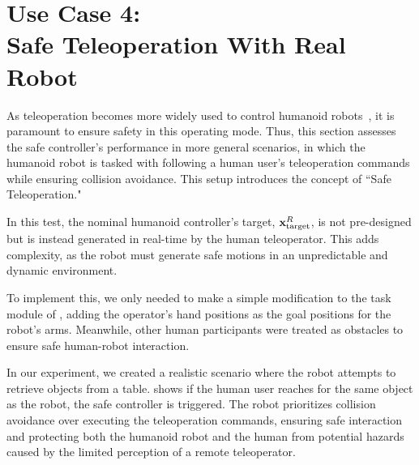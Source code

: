 \section{Use Case 4: \\ Safe Teleoperation With Real Robot}\label{sec: usecase_safe_teleop_real}

As teleoperation becomes more widely used to control humanoid robots~\cite{goodrich2013teleop,kourosh2023teleop}, it is paramount to ensure safety in this operating mode.
Thus, this section assesses the safe controller's performance in more general scenarios, in which the humanoid robot is tasked with following a human user's teleoperation commands while ensuring collision avoidance. This setup introduces the concept of ``Safe Teleoperation."

In this test, the nominal humanoid controller's target, $\mathbf{x}^R_\mathrm{target}$, is not pre-designed but is instead generated in real-time by the human teleoperator. This adds complexity, as the robot must generate safe motions in an unpredictable and dynamic environment.

To implement this, we only needed to make a simple modification to the task module of \spark, adding the operator's hand positions as the goal positions for the robot's arms. Meanwhile, other human participants were treated as obstacles to ensure safe human-robot interaction.

In our experiment, we created a realistic scenario where the robot attempts to retrieve objects from a table. 
 shows if the human user reaches for the same object as the robot, the safe controller is triggered. 
The robot prioritizes collision avoidance over executing the teleoperation commands, ensuring safe interaction and protecting both the humanoid robot and the human from potential hazards caused by the limited perception of a remote teleoperator.